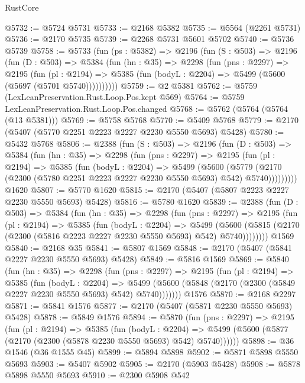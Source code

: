 \begin{lexlean}{RustCore}
\begin{coremodule}
@5732 := @5724 @5731
@5733 := @2168 @5382
@5735 := @5564 (@2261 @5731)
@5736 := @2170 @5735
@5739 := @2268 @5731 @5601 @5702
@5740 := @5736 @5739
@5758 := @5733
    (fun (ps : @5382) =>
    @2196
      (fun (S : @503) =>
      @2196
        (fun (D : @503) =>
        @5384
          (fun (hn : @35) =>
          @2298
            (fun (pns : @2297) =>
            @2195
              (fun (pl : @2194) =>
              @5385 (fun (bodyL : @2204) => @5499 (@5600 (@5697 (@5701 @5740))))))))))
@5759 := @2 @5381
@5762 := @5759 (LexLeanPreservation.Rust.Loop.Pos.kept @569)
@5764 := @5759 LexLeanPreservation.Rust.Loop.Pos.changed
@5768 := @5762 (@5764 (@5764 (@13 @5381)))
@5769 := @5758 @5768
@5770 := @5409 @5768
@5779 := @2170 (@5407 (@5770 @2251 @2223 @2227 @2230 @5550 @5693) @5428)
@5780 := @5432 @5768
@5806 := @2388
    (fun (S : @503) =>
    @2196
      (fun (D : @503) =>
      @5384
        (fun (hn : @35) =>
        @2298
          (fun (pns : @2297) =>
          @2195
            (fun (pl : @2194) =>
            @5385
              (fun (bodyL : @2204) =>
              @5499
                (@5600
                  (@5779
                    (@2170 (@2300 (@5780 @2251 @2223 @2227 @2230 @5550 @5693) @542) @5740)))))))))
    @1620
@5807 := @5770 @1620
@5815 := @2170 (@5407 (@5807 @2223 @2227 @2230 @5550 @5693) @5428)
@5816 := @5780 @1620
@5839 := @2388
    (fun (D : @503) =>
    @5384
      (fun (hn : @35) =>
      @2298
        (fun (pns : @2297) =>
        @2195
          (fun (pl : @2194) =>
          @5385
            (fun (bodyL : @2204) =>
            @5499
              (@5600 (@5815 (@2170 (@2300 (@5816 @2223 @2227 @2230 @5550 @5693) @542) @5740))))))))
    @1569
@5840 := @2168 @35
@5841 := @5807 @1569
@5848 := @2170 (@5407 (@5841 @2227 @2230 @5550 @5693) @5428)
@5849 := @5816 @1569
@5869 := @5840
    (fun (hn : @35) =>
    @2298
      (fun (pns : @2297) =>
      @2195
        (fun (pl : @2194) =>
        @5385
          (fun (bodyL : @2204) =>
          @5499 (@5600 (@5848 (@2170 (@2300 (@5849 @2227 @2230 @5550 @5693) @542) @5740)))))))
    @1576
@5870 := @2168 @2297
@5871 := @5841 @1576
@5877 := @2170 (@5407 (@5871 @2230 @5550 @5693) @5428)
@5878 := @5849 @1576
@5894 := @5870
    (fun (pns : @2297) =>
    @2195
      (fun (pl : @2194) =>
      @5385
        (fun (bodyL : @2204) =>
        @5499 (@5600 (@5877 (@2170 (@2300 (@5878 @2230 @5550 @5693) @542) @5740))))))
@5898 := @36 @1546 (@36 @1555 @45)
@5899 := @5894 @5898
@5902 := @5871 @5898 @5550 @5693
@5903 := @5407 @5902
@5905 := @2170 (@5903 @5428)
@5908 := @5878 @5898 @5550 @5693
@5910 := @2300 @5908 @542

\end{coremodule}
\end{lexlean}
